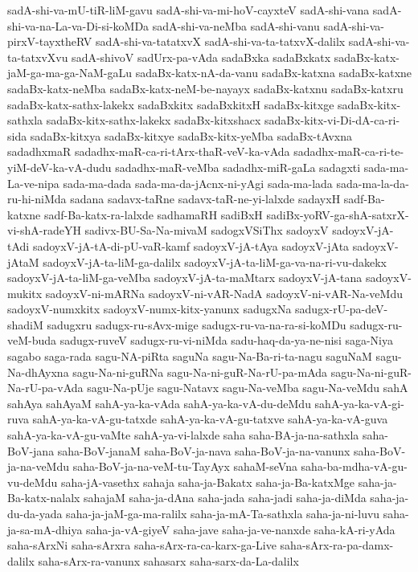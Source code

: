 {sadA-shi-va-mU-tiR-liM-gavu
sadA-shi-va-mi-hoV-cayxteV
sadA-shi-vana
sadA-shi-va-na-La-va-Di-si-koMDa
sadA-shi-va-neMba
sadA-shi-vanu
sadA-shi-va-pirxV-tayxtheRV
sadA-shi-va-tatatxvX
sadA-shi-va-ta-tatxvX-dalilx
sadA-shi-va-ta-tatxvXvu
sadA-shivoV
sadUrx-pa-vAda
sadaBxka
sadaBxkatx
sadaBx-katx-jaM-ga-ma-ga-NaM-gaLu
sadaBx-katx-nA-da-vanu
sadaBx-katxna
sadaBx-katxne
sadaBx-katx-neMba
sadaBx-katx-neM-be-nayayx
sadaBx-katxnu
sadaBx-katxru
sadaBx-katx-sathx-lakekx
sadaBxkitx
sadaBxkitxH
sadaBx-kitxge
sadaBx-kitx-sathxla
sadaBx-kitx-sathx-lakekx
sadaBx-kitxshacx
sadaBx-kitx-vi-Di-dA-ca-ri-sida
sadaBx-kitxya
sadaBx-kitxye
sadaBx-kitx-yeMba
sadaBx-tAvxna
sadadhxmaR
sadadhx-maR-ca-ri-tArx-thaR-veV-ka-vAda
sadadhx-maR-ca-ri-te-yiM-deV-ka-vA-dudu
sadadhx-maR-veMba
sadadhx-miR-gaLa
sadagxti
sada-ma-La-ve-nipa
sada-ma-dada
sada-ma-da-jAcnx-ni-yAgi
sada-ma-lada
sada-ma-la-da-ru-hi-niMda
sadana
sadavx-taRne
sadavx-taR-ne-yi-lalxde
sadayxH
sadf-Ba-katxne
sadf-Ba-katx-ra-lalxde
sadhamaRH
sadiBxH
sadiBx-yoRV-ga-shA-satxrX-vi-shA-radeYH
sadivx-BU-Sa-Na-mivaM
sadogxVSiThx
sadoyxV
sadoyxV-jA-tAdi
sadoyxV-jA-tA-di-pU-vaR-kamf
sadoyxV-jA-tAya
sadoyxV-jAta
sadoyxV-jAtaM
sadoyxV-jA-ta-liM-ga-dalilx
sadoyxV-jA-ta-liM-ga-va-na-ri-vu-dakekx
sadoyxV-jA-ta-liM-ga-veMba
sadoyxV-jA-ta-maMtarx
sadoyxV-jA-tana
sadoyxV-mukitx
sadoyxV-ni-mARNa
sadoyxV-ni-vAR-NadA
sadoyxV-ni-vAR-Na-veMdu
sadoyxV-numxkitx
sadoyxV-numx-kitx-yanunx
sadugxNa
sadugx-rU-pa-deV-shadiM
sadugxru
sadugx-ru-sAvx-mige
sadugx-ru-va-na-ra-si-koMDu
sadugx-ru-veM-buda
sadugx-ruveV
sadugx-ru-vi-niMda
sadu-haq-da-ya-ne-nisi
saga-Niya
sagabo
saga-rada
sagu-NA-piRta
saguNa
sagu-Na-Ba-ri-ta-nagu
saguNaM
sagu-Na-dhAyxna
sagu-Na-ni-guRNa
sagu-Na-ni-guR-Na-rU-pa-mAda
sagu-Na-ni-guR-Na-rU-pa-vAda
sagu-Na-pUje
sagu-Natavx
sagu-Na-veMba
sagu-Na-veMdu
sahA
sahAya
sahAyaM
sahA-ya-ka-vAda
sahA-ya-ka-vA-du-deMdu
sahA-ya-ka-vA-gi-ruva
sahA-ya-ka-vA-gu-tatxde
sahA-ya-ka-vA-gu-tatxve
sahA-ya-ka-vA-guva
sahA-ya-ka-vA-gu-vaMte
sahA-ya-vi-lalxde
saha
saha-BA-ja-na-sathxla
saha-BoV-jana
saha-BoV-janaM
saha-BoV-ja-nava
saha-BoV-ja-na-vanunx
saha-BoV-ja-na-veMdu
saha-BoV-ja-na-veM-tu-TayAyx
sahaM-seVna
saha-ba-mdha-vA-gu-vu-deMdu
saha-jA-vasethx
sahaja
saha-ja-Bakatx
saha-ja-Ba-katxMge
saha-ja-Ba-katx-nalalx
sahajaM
saha-ja-dAna
saha-jada
saha-jadi
saha-ja-diMda
saha-ja-du-da-yada
saha-ja-jaM-ga-ma-ralilx
saha-ja-mA-Ta-sathxla
saha-ja-ni-luvu
saha-ja-sa-mA-dhiya
saha-ja-vA-giyeV
saha-jave
saha-ja-ve-nanxde
saha-kA-ri-yAda
saha-sArxNi
saha-sArxra
saha-sArx-ra-ca-karx-ga-Live
saha-sArx-ra-pa-damx-dalilx
saha-sArx-ra-vanunx
sahasarx
saha-sarx-da-La-dalilx
}

